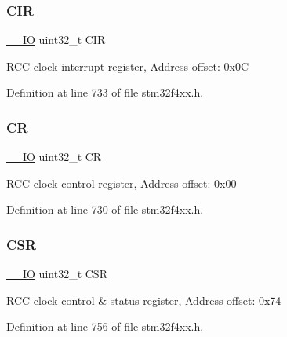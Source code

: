 \subsubsection{\texorpdfstring{C\+IR}{CIR}}
{\footnotesize\ttfamily \hyperlink{group___c_m_s_i_s__core__definitions_gaec43007d9998a0a0e01faede4133d6be}{\+\_\+\+\_\+\+IO} uint32\+\_\+t C\+IR}

R\+CC clock interrupt register, Address offset\+: 0x0C 

Definition at line 733 of file stm32f4xx.\+h.

\mbox{\label{struct_r_c_c___type_def_ab40c89c59391aaa9d9a8ec011dd0907a}} 
\subsubsection{\texorpdfstring{CR}{CR}}
{\footnotesize\ttfamily \hyperlink{group___c_m_s_i_s__core__definitions_gaec43007d9998a0a0e01faede4133d6be}{\+\_\+\+\_\+\+IO} uint32\+\_\+t CR}

R\+CC clock control register, Address offset\+: 0x00 

Definition at line 730 of file stm32f4xx.\+h.

\mbox{\label{struct_r_c_c___type_def_a876dd0a8546697065f406b7543e27af2}} 
\subsubsection{\texorpdfstring{C\+SR}{CSR}}
{\footnotesize\ttfamily \hyperlink{group___c_m_s_i_s__core__definitions_gaec43007d9998a0a0e01faede4133d6be}{\+\_\+\+\_\+\+IO} uint32\+\_\+t C\+SR}

R\+CC clock control \& status register, Address offset\+: 0x74 

Definition at line 756 of file stm32f4xx.\+h.

\mbox{\label{struct_r_c_c___type_def_ae6ff257862eba6b4b367feea786bf1fd}} 
